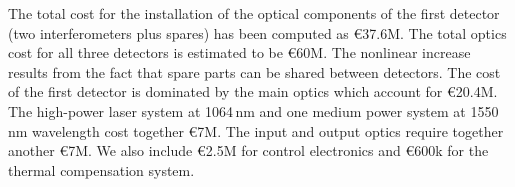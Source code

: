 The total cost for the installation of the optical components of the first detector (two interferometers plus spares) has
been computed as \euro37.6M. The total optics cost for all three detectors is estimated to be \euro60M. The nonlinear increase results
from the fact that spare parts can be shared between detectors. The cost of the first detector is dominated by the main
optics which account for \euro20.4M. The high-power laser system at 1064\,nm and one medium power system at 1550\,nm
wavelength cost together \euro7M. The input and output optics require together another \euro7M. We also include 
\euro2.5M for control electronics and \euro600k for the thermal compensation system.
